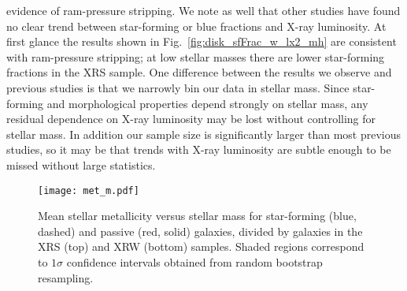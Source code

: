evidence of ram-pressure stripping.  We note as well that other
studies \citep[e.g.][]{balogh2002a, fairley2002, wake2005, lopes2014}
have found no clear trend between star-forming or blue fractions and
X-ray luminosity.  At first glance the results shown in
Fig.~\ref{fig:disk_sfFrac_w_lx2_mh} are consistent with ram-pressure
stripping; at low stellar masses there are lower star-forming
fractions in the XRS sample.  One difference between the results we
observe and previous studies is that we narrowly bin our data in
stellar mass.  Since star-forming and morphological properties depend
strongly on stellar mass, any residual dependence on X-ray luminosity
may be lost without controlling for stellar mass.  In addition our
sample size is significantly larger than most previous studies, so it
may be that trends with X-ray luminosity are subtle enough to be
missed without large statistics.

\begin{figure}[!tp]
  \centering
  \texttt{[image: met\_m.pdf]}
  \caption{Mean stellar metallicity versus stellar mass for
    star-forming (blue, dashed) and passive (red, solid) galaxies,
    divided by galaxies in the XRS (top) and XRW (bottom) samples.
    Shaded regions correspond to $1\sigma$ confidence intervals
    obtained from random bootstrap resampling.}
  \label{fig:met_m}
\end{figure}

